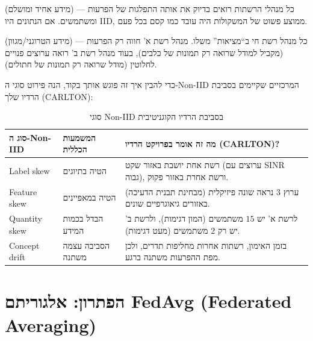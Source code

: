 \documentclass[11pt,a4paper]{article}
\begin{document}
\begin{description}[style=nextline, leftmargin=2.8cm, labelwidth=2.5cm]
  \item[\textbf{IID}]
    (מידע אחיד ומושלם) --- כל מנהלי הרשתות רואים בדיוק את אותה התפלגות של הפרעות ומשתמשים.
    אם הנתונים היו IID, ממוצע פשוט של המשקולות היה עובד כמו קסם בכל פעם.

  \item[\textbf{Non-IID}]
    (מידע הטרוגני/מגוון) --- כל מנהל רשת חי ב``מציאות'' משלו.
    מנהל רשת א' חווה רק הפרעות (מקביל למודל שרואה רק תמונות של כלבים), בעוד מנהל רשת ב' רואה ערוצים פנויים לחלוטין (מודל שרואה רק תמונות של חתולים).
\end{description}

כדי להבין איך זה פוגש אותך בקוד, הנה פירוט סוגי ה-Non-IID המרכזיים שקיימים בסביבת הרדיו שלך (CARLTON):

\begin{table}[H]
  \centering
  \caption{סוגי Non-IID בסביבת הרדיו הקוגניטיבית}
  \label{tab:non-iid}
  \begin{tabular}{@{}>{\raggedright\arraybackslash}p{2.8cm}>{\raggedright\arraybackslash}p{4.2cm}>{\raggedright\arraybackslash}p{6.2cm}@{}}
    \toprule
    \textbf{סוג ה-Non-IID} & \textbf{המשמעות הכללית} & \textbf{מה זה אומר בפרויקט הרדיו (CARLTON)?} \\
    \midrule
    Label skew &
    הטיה בתיוגים &
    רשת אחת יושבת באזור שקט (ערוצים עם SINR גבוה), ורשת אחרת באזור פקוק. \\
    \addlinespace
    Feature skew &
    הטיה במאפיינים &
    ערוץ $3$ נראה שונה פיזיקלית (מבחינת תבנית הדעיכה) באזורים גיאוגרפיים שונים. \\
    \addlinespace
    Quantity skew &
    הבדל בכמות המידע &
    לרשת א' יש $15$ משתמשים (המון דגימות), ולרשת ב' יש רק $2$ משתמשים (מעט דגימות). \\
    \addlinespace
    Concept drift &
    הסביבה עצמה משתנה &
    בזמן האימון, רשתות אחרות מחליפות תדרים, ולכן מפת ההפרעות משתנה ברגע. \\
    \bottomrule
  \end{tabular}
\end{table}

\section{הפתרון: אלגוריתם FedAvg (Federated Averaging)}
\end{document}
